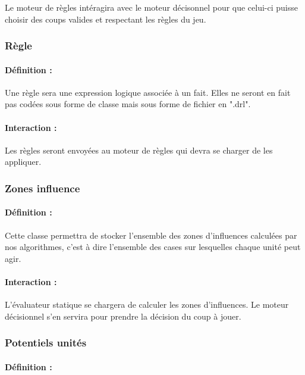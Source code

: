 \documentclass[12pt]{article}
\begin{document}
				Le moteur de règles intéragira avec le moteur décisonnel pour que celui-ci puisse choisir des coups valides et respectant les règles du jeu.

			\subsubsection{Règle}

				\paragraph{Définition :}

				Une règle sera une expression logique associée à un fait. Elles ne seront en fait pas codées sous forme de classe mais sous forme de fichier en ".drl".

				\paragraph{Interaction :}

				Les règles seront envoyées au moteur de règles qui devra se charger de les appliquer.

			\subsubsection{Zones influence}

				\paragraph{Définition :}

				Cette classe permettra de stocker l'ensemble des zones d'influences calculées par nos algorithmes, c'est à dire l'ensemble des cases sur lesquelles chaque unité peut agir.

				\paragraph{Interaction :}

				L'évaluateur statique se chargera de calculer les zones d'influences. Le moteur décisionnel s'en servira pour prendre la décision du coup à jouer.

			\subsubsection{Potentiels unités}

				\paragraph{Définition :}
\end{document}
